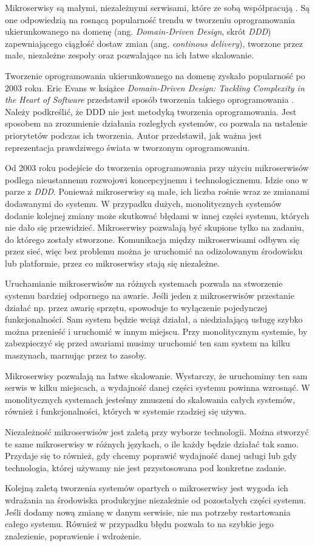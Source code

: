 Mikroserwisy są małymi, niezależnymi serwisami, które ze sobą współpracują \cite{newman}. Są one odpowiedzią na rosnącą popularność trendu w tworzeniu oprogramowania ukierunkowanego na domenę (ang. \textsl{Domain-Driven Design}, skrót \textsl{DDD}) zapewniającego ciągłość dostaw zmian (ang. \textsl{continous delivery}), tworzone przez małe, niezależne zespoły oraz pozwalające na ich łatwe skalowanie. 

Tworzenie oprogramowania ukierunkowanego na domenę zyskało popularność po 2003 roku. Eric Evans w książce \textsl{Domain-Driven Design: Tackling Complexity in the Heart of Software} przedstawił sposób tworzenia takiego oprogramowania  \cite{ddd}. Należy podkreślić, że DDD nie jest metodyką tworzenia oprogramowania. Jest sposobem na zrozumienie działania rozległych systemów, co pozwala na ustalenie priorytetów podczas ich tworzenia. Autor przedstawił, jak ważna jest reprezentacja prawdziwego świata w tworzonym oprogramowaniu. 

Od 2003 roku podejście do tworzenia oprogramowania przy użyciu mikroserwisów podlega nieustannemu rozwojowi koncepcyjnemu i technologicznemu. Idzie ono w parze z \textsl{DDD}. Ponieważ mikroserwisy są małe, ich liczba rośnie wraz ze zmianami dodawanymi do systemu. W przypadku dużych,  monolitycznych systemów dodanie kolejnej zmiany może skutkować błędami w innej części systemu, których nie dało się przewidzieć. Mikroserwisy pozwalają być skupione tylko na zadaniu, do którego zostały stworzone. Komunikacja między mikroserwisami odbywa się przez sieć, więc bez problemu można je uruchomić na odizolowanym środowisku lub platformie, przez co mikroserwisy stają się niezależne. 

Uruchamianie mikroserwisów na różnych systemach pozwala na stworzenie systemu bardziej odpornego na awarie. Jeśli jeden z mikroserwisów przestanie działać np. przez awarię sprzętu, spowoduje to wyłączenie pojedynczej funkcjonalności. Sam system będzie wciąż działał, a niedziałającą usługę szybko można przenieść i uruchomić w innym miejscu. Przy monolitycznym systemie, by zabezpieczyć się przed awariami musimy uruchomić ten sam system na kilku maszynach, marnując przez to zasoby.

Mikroserwisy pozwalają na łatwe skalowanie. Wystarczy, że uruchomimy ten sam serwis w kilku miejscach, a wydajność danej części systemu powinna wzrosnąć. W monolitycznych systemach jesteśmy zmuszeni do skalowania całych systemów, również i funkcjonalności, których w systemie rzadziej się używa.

Niezależność mikroserwisów jest zaletą przy wyborze technologii. Można stworzyć te same mikroserwisy w różnych językach, o ile każdy będzie działać tak samo. Przydaje się to również, gdy chcemy poprawić wydajność danej usługi lub gdy technologia, której używamy nie jest przystosowana pod konkretne zadanie. 

Kolejną zaletą tworzenia systemów opartych o mikroserwisy jest wygoda ich wdrażania na środowiska produkcyjne niezależnie od pozostałych części systemu. Jeśli dodamy nową zmianę w danym serwisie, nie ma potrzeby restartowania całego systemu. Również w przypadku błędu pozwala to na szybkie jego znalezienie, poprawienie i wdrożenie.